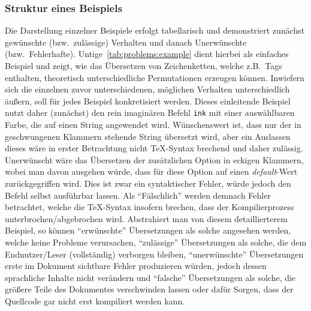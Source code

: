 \subsubsection*{Struktur eines Beispiels}
Die Darstellung einzelner Beispiele erfolgt tabellarisch und demonstriert zunächst gewünschte (bzw.\ zulässige) Verhalten und danach Unerwünschte (bzw.\ Fehlerhafte). Untige~\ref{tab:problems:example} dient hierbei als einfaches Beispiel und zeigt, wie das Übersetzen von Zeichenketten, welche z.B.\ Tags enthalten, theoretisch unterschiedliche Permutationen erzeugen können. Inwiefern sich die einzelnen zuvor unterschiedenen, möglichen Verhalten unterschiedlich äußern, soll für jedes Beispiel konkretisiert werden. Dieses einleitende Beispiel nutzt daher (zunächst) den rein imaginären Befehl \texttt{ink} mit einer auswählbaren Farbe, die auf einen String angewendet wird. Wünschenswert ist, dass nur der in geschwungenen Klammern stehende String übersetzt wird, aber ein Auslassen dieses wäre in erster Betrachtung nicht \TeX{}-Syntax brechend und daher zulässig. Unerwünscht wäre das Übersetzen der zusätzlichen Option in eckigen Klammern, wobei man davon ausgehen würde, dass für diese Option auf einen \textit{default}-Wert zurückgegriffen wird. Dies ist zwar ein syntaktischer Fehler, würde jedoch den Befehl selbst ausführbar lassen. Als \enquote{Fälschlich} werden demnach Fehler betrachtet, welche die \TeX{}-Syntax insofern brechen, dass der Kompilierprozess unterbrochen/abgebrochen wird.
Abstrahiert man von diesem detaillierterem Beispiel, so können \enquote{erwünschte} Übersetzungen als solche angesehen werden, welche keine Probleme verursachen, \enquote{zulässige} Übersetzungen als solche, die dem Endnutzer/Leser (vollständig) verborgen bleiben, \enquote{unerwünschte} Übersetzungen erste im Dokument sichtbare Fehler produzieren würden, jedoch dessen sprachliche Inhalte nicht verändern und \enquote{falsche} Übersetzungen als solche, die größere Teile des Dokumentes verschwinden lassen oder dafür Sorgen, dass der Quellcode gar nicht erst kompiliert werden kann.
